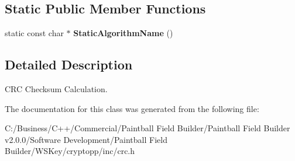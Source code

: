\subsection*{Static Public Member Functions}
\begin{DoxyCompactItemize}
\item 
\hypertarget{class_c_r_c32_a2de268b8b839918bd115c5ed784104a7}{
static const char $\ast$ {\bfseries StaticAlgorithmName} ()}
\label{class_c_r_c32_a2de268b8b839918bd115c5ed784104a7}

\end{DoxyCompactItemize}


\subsection{Detailed Description}
CRC Checksum Calculation. 

The documentation for this class was generated from the following file:\begin{DoxyCompactItemize}
\item 
C:/Business/C++/Commercial/Paintball Field Builder/Paintball Field Builder v2.0.0/Software Development/Paintball Field Builder/WSKey/cryptopp/inc/crc.h\end{DoxyCompactItemize}
